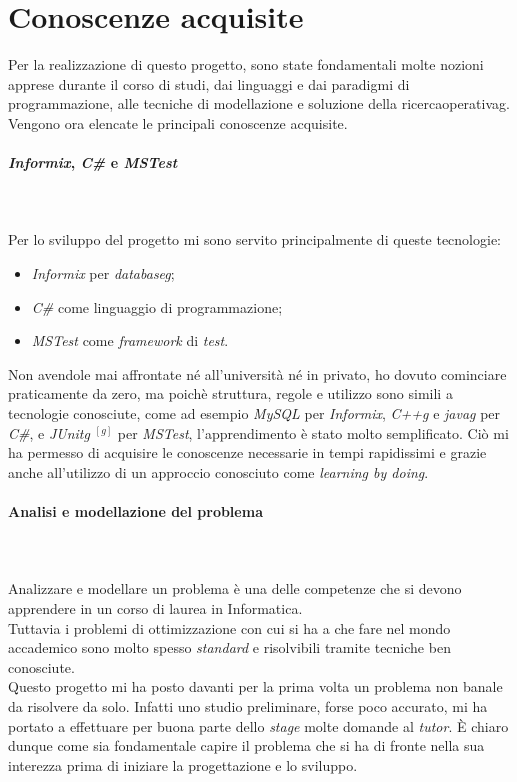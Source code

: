 \section{Conoscenze acquisite}
\label{sec:conoscenze-acquisite}
\noindent Per la realizzazione di questo progetto, sono state fondamentali
molte nozioni apprese durante il corso di studi,
dai linguaggi e dai paradigmi di programmazione,
alle tecniche di modellazione e soluzione della \gls{ricercaoperativag}.
Vengono ora elencate le principali conoscenze acquisite.
\paragraph{\textit{Informix}, \textit{C\#} e \textit{MSTest}}\hfill\\\\
\noindent Per lo sviluppo del progetto mi sono servito principalmente di queste tecnologie:
\begin{itemize}
    \item \textit{Informix} per \textit{\gls{databaseg}};
    \item \textit{C\#} come linguaggio di programmazione;
    \item \textit{MSTest} come \textit{framework} di \textit{test}.
\end{itemize}
\noindent Non avendole mai affrontate né all’università né in privato, ho dovuto
cominciare praticamente da zero, ma poichè struttura, regole e utilizzo sono simili
a tecnologie conosciute, come ad esempio \textit{MySQL} per \textit{Informix}, \textit{\gls{C++g}} e \textit{\gls{javag}} per \textit{C\#},
e \textit{\gls{JUnitg}} $^{[g]}$ per \textit{MSTest}, l’apprendimento è stato molto semplificato.
Ciò mi ha permesso di acquisire le conoscenze necessarie in tempi rapidissimi
e grazie anche all'utilizzo di un approccio conosciuto come \textit{learning
by doing}.
\paragraph{Analisi e modellazione del problema}\hfill\\\\
Analizzare e modellare un problema è una delle competenze che si devono apprendere
in un corso di laurea in Informatica.\\
Tuttavia i problemi di ottimizzazione con cui si ha a che fare
nel mondo accademico sono molto spesso \textit{standard} e risolvibili tramite tecniche ben conosciute.\\
Questo progetto mi ha posto davanti per la prima volta un problema
non banale da risolvere da solo. Infatti uno studio preliminare, forse poco accurato,
mi ha portato a effettuare per buona parte dello \textit{stage} molte domande al \textit{tutor}.
È chiaro dunque come sia fondamentale capire il problema che si ha di fronte nella
sua interezza prima di iniziare la progettazione e lo sviluppo.

